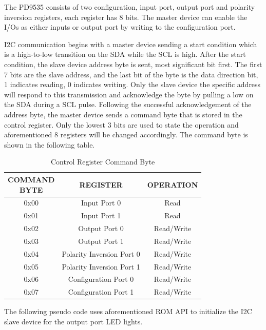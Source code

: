 The PD9535 consists of two configuration, input port, output port and polarity inversion registers, each register has 8 bits. The master device can enable the I/Os as either inputs or output port by writing to the configuration port.

I2C communication begins with a master device sending a start condition which is a high-to-low transition on the SDA while the SCL is high. After the start condition, the slave device address byte is sent, most significant bit first. The first 7 bits are the slave address, and the last bit of the byte is the data direction bit, 1 indicates reading, 0 indicates writing. Only the slave device the specific address will respond to this transmission and acknowledge the byte by pulling a low on the SDA during a SCL pulse. Following the successful acknowledgement of the address byte, the master device sends a command byte that is stored in the control register. Only the lowest 3 bits are used to state the operation and aforementioned 8 registers will be changed accordingly. The command byte is shown in the following table.

\begin{center}
	\begin{table}
		\begin{tabular}{|c|c|c|} 
			\hline
			\makecell{COMMAND \\BYTE} & REGISTER & OPERATION \\ [0.5ex] 
			\hline
			0x00 & Input Port 0 & Read \\ 
			\hline
			0x01 & Input Port 1 & Read \\
			\hline
			0x02 & Output Port 0 & Read/Write \\
			\hline
			0x03 & Output Port 1 & Read/Write \\
			\hline
			0x04 & Polarity Inversion Port 0 & Read/Write \\
			\hline
			0x05 & Polarity Inversion Port 1 & Read/Write \\
			\hline
			0x06 & Configuration Port 0 & Read/Write \\
			\hline
			0x07 & Configuration Port 1 & Read/Write \\
			\hline
		\end{tabular}
		\caption{Control Register Command Byte}
		\label{tab:i2ccommand}
	\end{table}
\end{center}


The following pseudo code uses aforementioned ROM API to initialize the I2C slave device for the output port LED lights.

